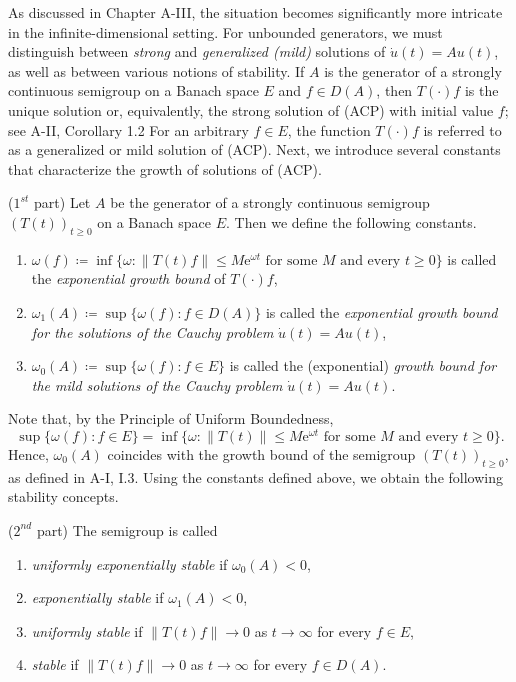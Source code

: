 As discussed in Chapter A-III, the situation becomes significantly more intricate in the infinite-dimensional setting. 
For unbounded generators, we must distinguish between \emph{strong} and \emph{generalized (mild)} solutions of $\dot{u}(t) = Au(t)$, as well as between various notions of stability.
If $A$ is the generator of a strongly continuous semigroup on a Banach space $E$ and $f \in D(A)$, then $T(\cdot)f$ is the unique solution or, equivalently, the strong solution of (ACP) with initial value $f$; see A-II, Corollary 1.2 
For an arbitrary $f \in E$, the function $T(\cdot)f$ is referred to as a generalized or mild solution of (ACP). 
Next, we introduce several constants that characterize the growth of solutions of (ACP).
\begin{definition}($1^{st}$ part)\label{def:a4-1.1} 
Let $A$ be the generator of a strongly continuous semigroup $ (T(t))_{t \geq 0} $ on a Banach space $E$. 
Then we define the following constants.
\begin{enumerate}[\upshape (i)]
\item 
$\omega(f) \coloneqq \inf\{\omega \colon \|T(t)f\| \leq M\mathrm{e}^{\omega t} \text{ for some } M \text{ and every } t \geq 0\}$ is called the \emph{exponential growth bound} of $T(\cdot)f$,

\item 
$\omega_{1}(A) \coloneqq \sup\{\omega(f) \colon f \in D(A)\}$ is called the \emph{exponential growth bound for the solutions of the Cauchy problem} $\dot{u}(t) = Au(t)$,

\item 
$\omega_{0}(A) \coloneqq \sup\{\omega(f) \colon f \in E\}$ is called the (exponential) \emph{growth bound for the mild solutions of the Cauchy problem} $\dot{u}(t) = Au(t)$.

\end{enumerate}
\end{definition}
Note that, by the Principle of Uniform Boundedness, 
\[
\sup\{\omega(f) \colon f \in E\} 
= \inf \{ \omega \colon \|T(t)\| \leq M\mathrm{e}^{\omega t} 
    \text{ for some $M$ and every $t \geq 0 $}\}.
\]
Hence, $\omega_{0}(A)$ coincides with the growth bound of the semigroup $(T(t))_{t \geq 0}$, as defined in A-I, I.3. 
Using the constants defined above, we obtain the following stability concepts.
\setcounter{theorem}{0}
\begin{definition}($2^{nd}$ part)
The semigroup is called
\begin{enumerate}
\item
\emph{uniformly exponentially stable} if $\omega_{0}(A) < 0$,
\item 
\emph{exponentially stable} if $\omega_{1}(A) < 0$,
\item 
\emph{uniformly stable} if $\|T(t)f\| \to 0$ as $t \to \infty$ for every $f \in E$,
\item 
\emph{stable} if $\|T(t)f\| \to 0$ as $t \to \infty$ for every $f \in D(A)$.
\end{enumerate}
\end{definition}
